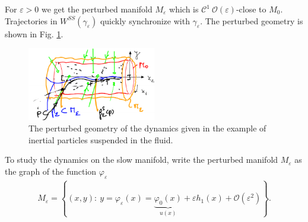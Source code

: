 \begin{ex}
For $\varepsilon>0$ we get the perturbed manifold $M_{\varepsilon}$ which is $\mathcal{C}^{1}\ \mathcal{O}(\varepsilon)$-close to $M_0$. Trajectories in $W^{SS}(\gamma_{\varepsilon})$ quickly synchronize with $\gamma_{\varepsilon}$. The perturbed geometry is shown in Fig. \ref{fig:perturbed_fluid_geometry}.

\begin{figure}[h!]
	\centering
	\includegraphics[width=0.5\textwidth]{figures/ch9/22perturbed_fluid_geometry.png}
	\caption{The perturbed geometry of the dynamics given in the example of inertial particles suspended in the fluid.}
	\label{fig:perturbed_fluid_geometry}
\end{figure}

To study the dynamics on the slow manifold, write the perturbed manifold $M_{\varepsilon}$ as the graph of the function $\varphi_{\varepsilon}$
\begin{align}
	M_{\varepsilon} = \left\{ (x,y):\ y=\varphi_{\varepsilon}(x)=\underbrace{\varphi_0(x)}_{u(x)} + \varepsilon h_{1}(x) + \mathcal{O}(\varepsilon^{2}) \right\}.
\end{align}


\end{ex}
